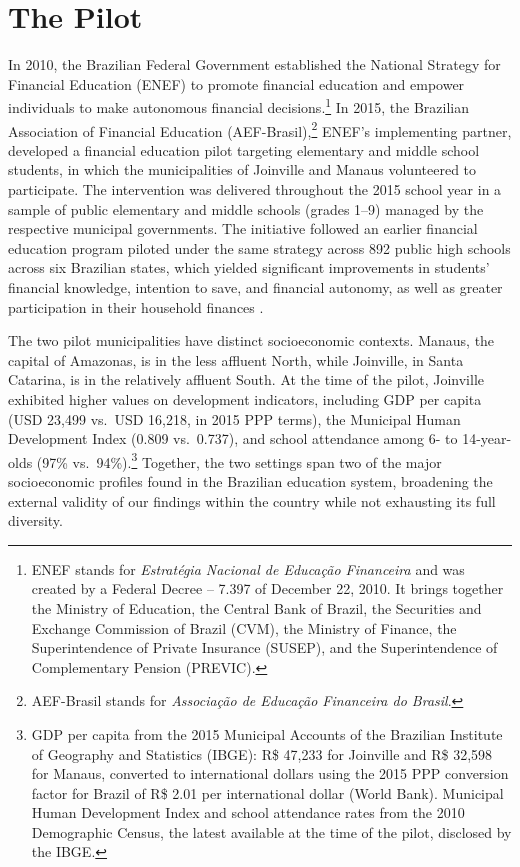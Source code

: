 \section{The Pilot}\label{sec:pilot}

In 2010, the Brazilian Federal Government established the National Strategy for Financial Education (ENEF) to promote financial education and empower individuals to make autonomous financial decisions.\footnote{ENEF stands for \textit{Estratégia Nacional de Educação Financeira} and was created by a Federal Decree -- 7.397 of December 22, 2010. It brings together the Ministry of Education, the Central Bank of Brazil, the Securities and Exchange Commission of Brazil (CVM), the Ministry of Finance, the Superintendence of Private Insurance (SUSEP), and the Superintendence of Complementary Pension (PREVIC).} In 2015, the Brazilian Association of Financial Education (AEF-Brasil),\footnote{AEF-Brasil stands for \textit{Associação de Educação Financeira do Brasil}.} ENEF's implementing partner, developed a financial education pilot targeting elementary and middle school students, in which the municipalities of Joinville and Manaus volunteered to participate. The intervention was delivered throughout the 2015 school year in a sample of public elementary and middle schools (grades 1--9) managed by the respective municipal governments. The initiative followed an earlier financial education program piloted under the same strategy across 892 public high schools across six Brazilian states, which yielded significant improvements in students' financial knowledge, intention to save, and financial autonomy, as well as greater participation in their household finances \citep{Bruhn2016}. 

The two pilot municipalities have distinct socioeconomic contexts. Manaus, the capital of Amazonas, is in the less affluent North, while Joinville, in Santa Catarina, is in the relatively affluent South. At the time of the pilot, Joinville exhibited higher values on development indicators, including GDP per capita (USD 23,499 vs.~USD 16,218, in 2015 PPP terms), the Municipal Human Development Index (0.809 vs.~0.737), and school attendance among 6- to 14-year-olds (97\% vs.~94\%).\footnote{GDP per capita from the 2015 Municipal Accounts of the Brazilian Institute of Geography and Statistics (IBGE): R\$ 47,233 for Joinville and R\$ 32,598 for Manaus, converted to international dollars using the 2015 PPP conversion factor for Brazil of R\$ 2.01 per international dollar (World Bank). Municipal Human Development Index and school attendance rates from the 2010 Demographic Census, the latest available at the time of the pilot, disclosed by the IBGE.} Together, the two settings span two of the major socioeconomic profiles found in the Brazilian education system, broadening the external validity of our findings within the country while not exhausting its full diversity. 

